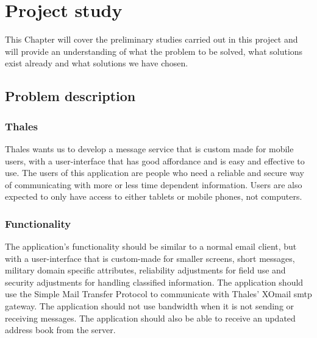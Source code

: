 \chapter{Project study}

This Chapter will cover the preliminary studies carried out in this project and will provide an understanding of what the problem to be solved, what solutions exist already and what solutions we have chosen.

\section{Problem description}

\subsection{Thales}
Thales wants us to develop a message service that is custom made for mobile users, with a user-interface that has good affordance and is easy and effective to use.
\newline
\newline
The users of this application are people who need a reliable and secure way of communicating with more or less time dependent information. Users are also expected to only have access to either tablets or mobile phones, not computers.

\subsection{Functionality}
The application's functionality should be similar to a normal email client, but with a user-interface that is custom-made for smaller screens, short messages, military domain specific  attributes, reliability adjustments for field use and security adjustments for handling classified information. The application should use the Simple Mail Transfer Protocol to communicate with Thales' XOmail \gls{smtp} gateway.
\newline
\newline
The application should not use bandwidth when it is not sending or receiving messages. The application should also be able to receive an updated address book from the server.

